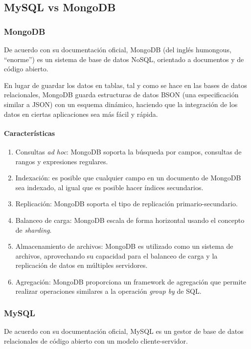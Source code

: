 \subsection{MySQL vs MongoDB}\label{ref:databases}
\subsubsection*{MongoDB}
De acuerdo con su documentación oficial\cite{mongodb_mongodb_2020}, MongoDB (del inglés humongous, ``enorme'') es un sistema de base de datos NoSQL, orientado a documentos y de código abierto.


En lugar de guardar los datos en tablas, tal y como se hace en las bases de datos relacionales, MongoDB guarda estructuras de datos BSON (una especificación similar a JSON) con un esquema dinámico, haciendo que la integración de los datos en ciertas aplicaciones sea más fácil y rápida.

\paragraph*{Características}
\begin{enumerate}
    \item Consultas \textit{ad hoc}: MongoDB soporta la búsqueda por campos, consultas de rangos y expresiones regulares.
    \item Indexación: es posible que cualquier campo en un documento de MongoDB sea indexado, al igual que es posible hacer índices secundarios. 
    \item Replicación: MongoDB soporta el tipo de replicación primario-secundario. 
    \item Balanceo de carga: MongoDB escala de forma horizontal usando el concepto de \textit{sharding}.
    \item Almacenamiento de archivos: MongoDB es utilizado como un sistema de archivos, aprovechando su capacidad para el balanceo de carga y la replicación de datos en múltiples servidores. 
    \item Agregación: MongoDB proporciona un framework de agregación que permite realizar operaciones similares a la operación \textit{group by} de SQL.
\end{enumerate}


\subsubsection*{MySQL}

De acuerdo con su documentación oficial\cite{mysql_mysql_2020}, MySQL es un gestor de base de datos relacionales de código abierto con un modelo cliente-servidor.


